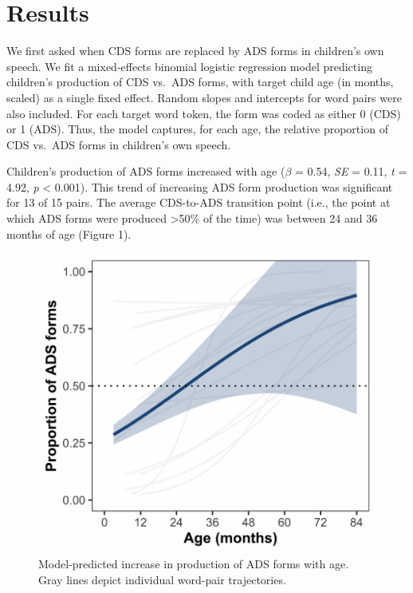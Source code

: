 \documentclass[10pt, letterpaper]{article}
\newenvironment{CodeChunk}{}{}
\begin{document}
\hypertarget{results}{%
\section{Results}\label{results}}

We first asked when CDS forms are replaced by ADS forms in children's
own speech. We fit a mixed-effects binomial logistic regression model
predicting children's production of CDS vs.~ADS forms, with target child
age (in months, scaled) as a single fixed effect. Random slopes and
intercepts for word pairs were also included. For each target word
token, the form was coded as either 0 (CDS) or 1 (ADS). Thus, the model
captures, for each age, the relative proportion of CDS vs.~ADS forms in
children's own speech.

Children's production of ADS forms increased with age (\(\beta\) = 0.54,
\emph{SE} = 0.11, \emph{t} = 4.92, \emph{p} \textless{} 0.001). This
trend of increasing ADS form production was significant for 13 of 15
pairs. The average CDS-to-ADS transition point (i.e., the point at which
ADS forms were produced \textgreater50\% of the time) was between 24 and
36 months of age (Figure 1).

\begin{CodeChunk}
\begin{figure}[h]

{\centering \includegraphics{figs/shift-timing-fig-1} 

}

\caption[Model-predicted increase in production of ADS forms with age]{Model-predicted increase in production of ADS forms with age. Gray lines depict individual word-pair trajectories.}\label{fig:shift-timing-fig}
\end{figure}
\end{CodeChunk}
\end{document}
